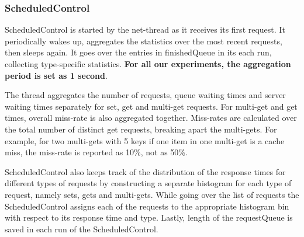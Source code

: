 \documentclass[11pt,a4paper]{article}
\begin{document}
\subsubsection{ScheduledControl} \label{sec:ov-scheduledcontrol}
ScheduledControl is started by the net-thread as it receives its first request. It periodically wakes up, aggregates the statistics over the most recent requests, then sleeps again. It goes over the entries in finishedQueue in its each run, collecting type-specific statistics. \textbf{For all our experiments, the aggregation period is set as 1 second}.
\par The thread aggregates the number of requests, queue waiting times and server waiting times separately for set, get and multi-get requests. For multi-get and get times, overall miss-rate is also aggregated together. Miss-rates are calculated over the total number of distinct get requests, breaking apart the multi-gets. For example, for two multi-gets with 5 keys if one item in one multi-get is a cache miss, the miss-rate is reported as 10\%, not as 50\%.
\par ScheduledControl also keeps track of the distribution of the response times for different types of requests by constructing a separate histogram for each type of request, namely sets, gets and multi-gets. While going over the list of requests the ScheduledControl assigns each of the requests to the appropriate histogram bin with respect to its response time and type. Lastly, length of the requestQueue is saved in each run of the ScheduledControl.
\end{document}

